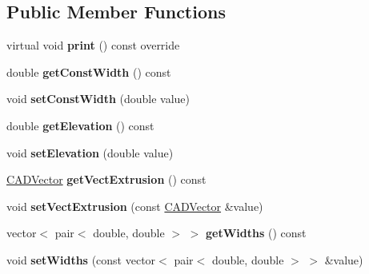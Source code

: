 \subsection*{Public Member Functions}
\begin{DoxyCompactItemize}
\item 
virtual void {\bfseries print} () const  override\hypertarget{class_c_a_d_l_w_polyline_a2c0a073ab6f626fbef987d3ac5c98b19}{}\label{class_c_a_d_l_w_polyline_a2c0a073ab6f626fbef987d3ac5c98b19}

\item 
double {\bfseries get\+Const\+Width} () const \hypertarget{class_c_a_d_l_w_polyline_a0ee3571f18e5c2a3f755ab7ef7b979e3}{}\label{class_c_a_d_l_w_polyline_a0ee3571f18e5c2a3f755ab7ef7b979e3}

\item 
void {\bfseries set\+Const\+Width} (double value)\hypertarget{class_c_a_d_l_w_polyline_a59e3ac8ba0ca76eef5a44e96e9937f1e}{}\label{class_c_a_d_l_w_polyline_a59e3ac8ba0ca76eef5a44e96e9937f1e}

\item 
double {\bfseries get\+Elevation} () const \hypertarget{class_c_a_d_l_w_polyline_a48dd80c3b22fd15365503f717932d426}{}\label{class_c_a_d_l_w_polyline_a48dd80c3b22fd15365503f717932d426}

\item 
void {\bfseries set\+Elevation} (double value)\hypertarget{class_c_a_d_l_w_polyline_af6ce34bb296f07f9ea1988aff184f86d}{}\label{class_c_a_d_l_w_polyline_af6ce34bb296f07f9ea1988aff184f86d}

\item 
\hyperlink{class_c_a_d_vector}{C\+A\+D\+Vector} {\bfseries get\+Vect\+Extrusion} () const \hypertarget{class_c_a_d_l_w_polyline_ab73d4a3b556ee073c3f94496a052f378}{}\label{class_c_a_d_l_w_polyline_ab73d4a3b556ee073c3f94496a052f378}

\item 
void {\bfseries set\+Vect\+Extrusion} (const \hyperlink{class_c_a_d_vector}{C\+A\+D\+Vector} \&value)\hypertarget{class_c_a_d_l_w_polyline_a7e06f07ab12407aa862c7f000cb1b827}{}\label{class_c_a_d_l_w_polyline_a7e06f07ab12407aa862c7f000cb1b827}

\item 
vector$<$ pair$<$ double, double $>$ $>$ {\bfseries get\+Widths} () const \hypertarget{class_c_a_d_l_w_polyline_ab4b812740b0338054a9176fd79ca822c}{}\label{class_c_a_d_l_w_polyline_ab4b812740b0338054a9176fd79ca822c}

\item 
void {\bfseries set\+Widths} (const vector$<$ pair$<$ double, double $>$ $>$ \&value)\hypertarget{class_c_a_d_l_w_polyline_ae8580bdd80ad48caf2ccafce9c230cba}{}\label{class_c_a_d_l_w_polyline_ae8580bdd80ad48caf2ccafce9c230cba}

\end{DoxyCompactItemize}
